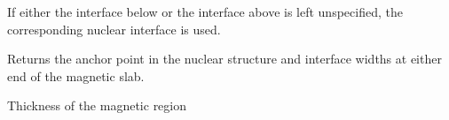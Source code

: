 \documentclass[letterpaper,10pt,english]{sphinxmanual}
\begin{document}
\begin{fulllineitems}
\begin{fulllineitems}
If either the interface below or the interface above is left
unspecified, the corresponding nuclear interface is used.

Returns the anchor point in the nuclear structure and interface
widths at either end of the magnetic slab.

\end{fulllineitems}


\begin{fulllineitems}
\label{api/magnetic:refl1d.magnetic.MagneticLayer.thickness}
Thickness of the magnetic region

\end{fulllineitems}


\begin{fulllineitems}
\label{api/magnetic:refl1d.magnetic.MagneticLayer.thicknessM}
\end{fulllineitems}


\end{fulllineitems}

\end{document}
